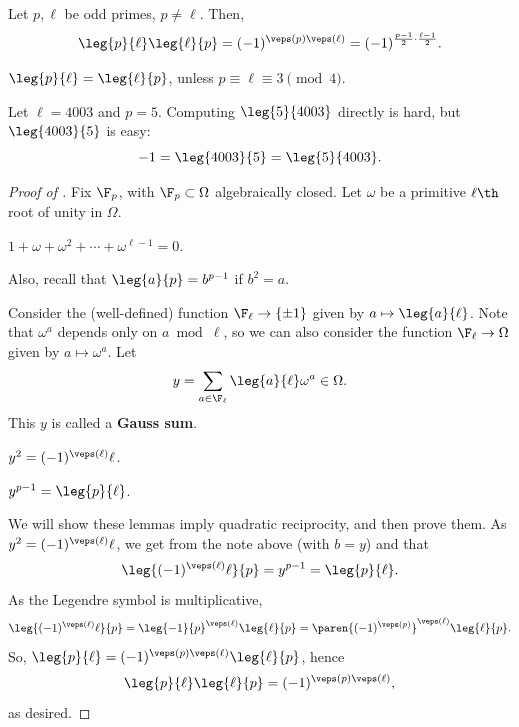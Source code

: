 \begin{thm}
    Let $p, \ell$ be odd primes, $p \neq \ell$. Then,
    $$\leg{p}{\ell} \leg{\ell}{p} = (-1)^{\veps(p)\veps(\ell)} = (-1)^{\frac{p-1}{2} \cdot \frac{\ell-1}{2}}.$$
\end{thm}

\begin{cor}
    $\leg{p}{\ell} = \leg{\ell}{p}$, unless $p \equiv \ell \equiv 3 \pmod 4$.
\end{cor}

\begin{ex}
    Let $\ell = 4003$ and $p = 5$. Computing $\leg{5}{4003}$ directly is hard, but $\leg{4003}{5}$ is easy:
    $$-1 = \leg{4003}{5} = \leg{5}{4003}.$$
\end{ex}

\begin{proof}[Proof of ]
    Fix $\F_p$, with $\F_p \subset \Omega$ algebraically closed. Let $\omega$ be a primitive $\ell\th$ root of unity in $\Omega$.

    \begin{lem}[][label=lem:qr0]
        $1 + \omega + \omega^2 + \cdots + \omega^{\ell - 1} = 0$.
    \end{lem}

    Also, recall that $\leg{a}{p} = b^{p-1}$ if $b^2 = a$.

    Consider the (well-defined) function $\F_\ell \to \{\pm 1\}$ given by $a \mapsto \leg{a}{\ell}$. Note that $\omega^a$ depends only on $a \bmod \ell$, so we can also consider the function $\F_\ell \to \Omega$ given by $a \mapsto \omega^a$. Let
    $$y = \sum_{a \in \F_\ell} \leg{a}{\ell} \omega^a \in \Omega.$$
    This $y$ is called a \textbf{Gauss sum}.

    \begin{lem}[][label=lem:qr1]
        $y^2 = (-1)^{\veps(\ell)} \ell$.
    \end{lem}

    \begin{lem}[][label=lem:qr2]
        $y^{p-1} = \leg{p}{\ell}$.
    \end{lem}

    We will show these lemmas imply quadratic reciprocity, and then prove them. As $y^2 = (-1)^{\veps(\ell)}\ell$, we get from the note above (with $b = y$) and  that
    $$\leg{(-1)^{\veps(\ell)}\ell}{p} = y^{p-1} = \leg{p}{\ell}.$$
    As the Legendre symbol is multiplicative,
    $$\leg{(-1)^{\veps(\ell)}\ell}{p} = \leg{-1}{p}^{\veps(\ell)} \leg{\ell}{p} = \paren{(-1)^{\veps(p)}}^{\veps(\ell)} \leg{\ell}{p}.$$
    So, $\leg{p}{\ell} = (-1)^{\veps(p)\veps(\ell)} \leg{\ell}{p}$, hence
    $$\leg{p}{\ell}\leg{\ell}{p} = (-1)^{\veps(p)\veps(\ell)},$$
    as desired.
\end{proof}

